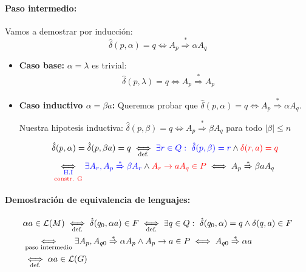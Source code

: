 \paragraph{Paso intermedio:} Vamos a demostrar por inducción: \[ \hat\delta(p,\alpha) = q \iff A_p \overset{*}{\Rightarrow} \alpha A_q\]

\begin{itemize}
  \item \textbf{Caso base:} \(\alpha = \lambda\) es trivial:
        \begin{align*}
           & \hat\delta(p,\lambda) = q \iff A_p \overset{*}{\Rightarrow} A_p
        \end{align*}
  \item \textbf{Caso inductivo \(\alpha = \beta a\):} Queremos probar que \(\hat\delta(p,\alpha) = q \iff A_p \overset{*}{\Rightarrow} \alpha A_q\).

        Nuestra hipotesis inductiva: \(\hat\delta(p,\beta) = q \iff A_p \overset{*}{\Rightarrow} \beta A_q\) para todo \(|\beta| \leq n\)

        \begin{align*}
           & \hat\delta(p, \alpha) = \hat\delta(p, \beta a) = q \iffa{def.}\blue{\exists r\in Q:~\hat\delta(p,\beta) = r} \land \red{\delta(r, a) = q}                                            \\
           & \iffab{\blue{H.I}}{\red{constr. G}} \blue{\exists A_r, A_p \overset{*}{\Rightarrow} \beta A_r} \land \red{A_r \rightarrow a A_q \in P} \iff A_p \overset{*}{\Rightarrow} \beta a A_q \\
        \end{align*}
\end{itemize}

\paragraph{Demostración de equivalencia de lenguajes:}
\begin{align*}
   & \alpha a\in\mathcal{L}(M) \iffa{def.} \hat\delta(q_0, \alpha a) \in F \iffa{def.} \exists q\in Q:~\hat\delta(q_0, \alpha) = q \land \delta(q,a)\in F                        \\
   & \underset{\text{paso intermedio}}{\iff} \exists A_p, A_{q0} \overset{*}{\Rightarrow} \alpha A_p \land A_p \rightarrow a \in P \iff A_{q0} \overset{*}{\Rightarrow} \alpha a \\
   & \underset{\text{def.}}{\iff} \alpha a \in\mathcal{L}(G)
\end{align*}
